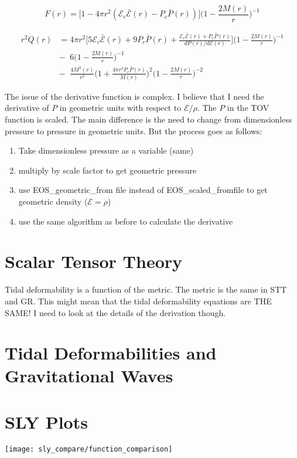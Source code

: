 \documentclass[11pt]{article}
\numberwithin{equation}{section}
\begin{document}
\begin{equation} 
F(r) = \bigg[ 1- 4 \pi r^{2} (\mathcal{E}_{c}\bar{\mathcal{E}}(r)-P_{c}\bar{P}(r))  \bigg] \bigg( 1-\frac{2 M(r) }{r}  \bigg)^{-1}
\end{equation}

\begin{align} 
r^{2} Q(r) &= 4 \pi r^{2} \bigg[ 5 \mathcal{E}_{c}\bar{\mathcal{E}}(r)+ 9 P_{c}\bar{P}(r) + \frac{\mathcal{E}_{c}\bar{\mathcal{E}}(r) + P_{c}\bar{P}(r)}{dP(r)/d\mathcal{E}(r)}   \bigg] \bigg(  1 - \frac{2 M(r)}{r} \bigg) ^{-1} \\
& - \;\; 6 \bigg( 1- \frac{2 M(r) }{r }  \bigg)^{-1} \nonumber \\	
& - \;\; \frac{4 M^{2}(r)}{r^{2}} \bigg( 1 + \frac{4 \pi r^3 P_{c} \bar{P}(r)}{M(r)}  \bigg)^{2} \bigg( 1 - \frac{2 M(r)}{r} \bigg)^{-2} \nonumber
\end{align}

The issue of the derivative function is complex.  I believe that I need the derivative of $P$ in geometric units with respect to $\mathcal{E}/\rho$.  The $P$ in the TOV function is scaled. 
The main difference is the need to change from dimensionless pressure to pressure in geometric units.  But the process goes as follows:

\begin{enumerate}
\item Take dimensionless pressure as a variable (same)
\item multiply by scale factor to get geometric pressure
\item use EOS\_geometric\_from file instead of EOS\_scaled\_fromfile to get geometric density ($\mathcal{E} = \rho$)
\item use the same algorithm as before to calculate the derivative
\end{enumerate}

\section{Scalar Tensor Theory}

Tidal deformability is a function of the metric.  The metric is the same in STT and GR.  This might mean that the tidal deformability equations are THE SAME!  I need to look at the details of the derivation though.

\section{Tidal Deformabilities and Gravitational Waves}

\clearpage

\section{SLY Plots}

\texttt{[image: sly\_compare/function\_comparison]} \\



\end{document}
